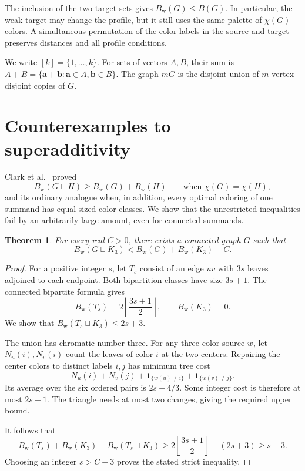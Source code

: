 \documentclass[11pt,reqno]{amsart}
\numberwithin{equation}{section}
\newtheorem{theorem}{Theorem}[section]
\theoremstyle{definition}
\theoremstyle{remark}
\begin{document}
The inclusion
of the two target sets gives $B_{\mathrm w}(G)\le B(G)$. In particular,
the weak target may change the profile, but it still uses the same palette
of $\chi(G)$ colors. A simultaneous permutation of the color labels in
the source and target preserves distances and all profile conditions.


We write $[k]=\{1,\ldots,k\}$. For sets of vectors $A,B$, their sum is
$A+B=\{\mathbf a+\mathbf b:\mathbf a\in A,\mathbf b\in B\}$.
The graph $mG$ is the disjoint union of $m$ vertex-disjoint copies of $G$.

\section{Counterexamples to superadditivity}\label{union:section}

Clark et al.~\cite[Propositions~3.7 and~3.8]{clark2006} proved
\begin{equation}\label{union:known-weak}
 B_{\mathrm w}(G\sqcup H)\ge B_{\mathrm w}(G)+B_{\mathrm w}(H)
 \qquad\text{when }\chi(G)=\chi(H),
\end{equation}
and its ordinary analogue when, in addition, every optimal coloring
of one summand has equal-sized color classes. We show that the
unrestricted inequalities fail by an arbitrarily large amount, even
for connected summands.

\begin{theorem}\label{union:weak-counterexample}
For every real $C>0$, there exists a connected graph $G$ such that
\[
 B_{\mathrm w}(G\sqcup K_3)
 <B_{\mathrm w}(G)+B_{\mathrm w}(K_3)-C.
\]
\end{theorem}
\begin{proof}
For a positive integer $s$, let $T_s$ consist of an edge $uv$ with
$3s$ leaves adjoined to each endpoint. Both bipartition classes have
size $3s+1$. The connected bipartite formula
\cite[Proposition~3.3]{clark2006} gives
\[
 B_{\mathrm w}(T_s)=2\left\lfloor\frac{3s+1}{2}\right\rfloor,
 \qquad B_{\mathrm w}(K_3)=0.
\]
We show that $B_{\mathrm w}(T_s\sqcup K_3)\le2s+3$.

The union has chromatic number three. For any three-color source $w$,
let $N_u(i),N_v(i)$ count the leaves of color $i$ at the two centers.
Repairing the center colors to distinct labels $i,j$ has minimum tree
cost
\[
 N_u(i)+N_v(j)
 +\mathbf1_{\{w(u)\ne i\}}+\mathbf1_{\{w(v)\ne j\}}.
\]
Its average over the six ordered pairs is $2s+4/3$. Some integer cost
is therefore at most $2s+1$. The triangle needs at most two changes,
giving the required upper bound.

It follows that
\[
 B_{\mathrm w}(T_s)+B_{\mathrm w}(K_3)
 -B_{\mathrm w}(T_s\sqcup K_3)
 \ge 2\left\lfloor\frac{3s+1}{2}\right\rfloor-(2s+3)
 \ge s-3.
\]
Choosing an integer $s>C+3$ proves the stated strict inequality.
\end{proof}
\end{document}
